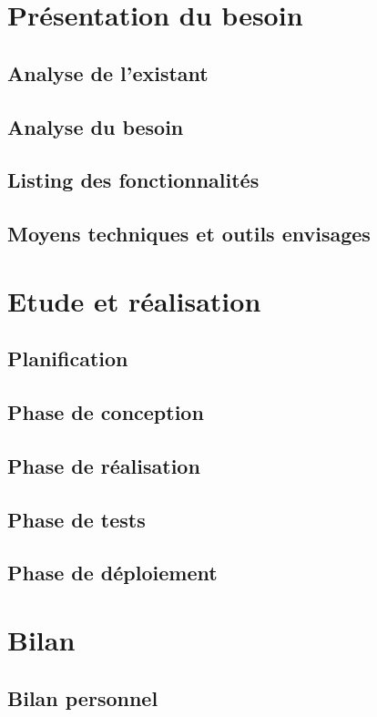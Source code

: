 \documentclass[a4paper]{article}
\begin{document}
    \section{Présentation du besoin}
    \subsection{Analyse de l'existant}
    \subsection{Analyse du besoin}
    \subsection{Listing des fonctionnalités}
    \subsection{Moyens techniques et outils envisages}

    \section{Etude et réalisation}
    \subsection{Planification}
    \subsection{Phase de conception}
    \subsection{Phase de réalisation}
    \subsection{Phase de tests}
    \subsection{Phase de déploiement}
   
    \section{Bilan}
    \subsection{Bilan personnel}
\end{document}
